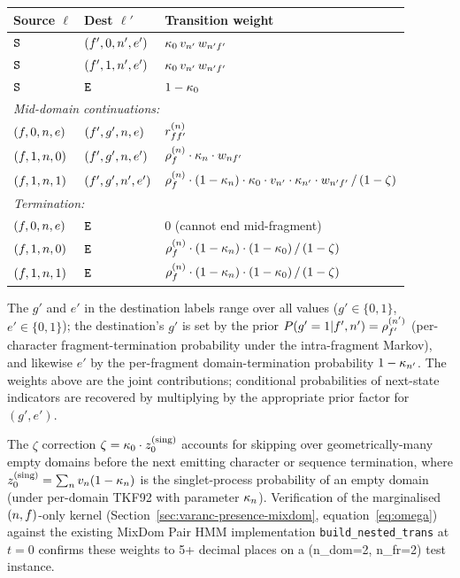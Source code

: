 \begin{center}
\renewcommand{\arraystretch}{1.4}
\begin{tabular}{lll}
\hline
Source $\ell$ & Dest $\ell'$ & Transition weight \\
\hline
${\tt S}$ & $(f', 0, n', e')$ &
  $\kappa_0\, v_{n'}\, w_{n'f'}$ \\
${\tt S}$ & $(f', 1, n', e')$ &
  $\kappa_0\, v_{n'}\, w_{n'f'}$ \\
${\tt S}$ & ${\tt E}$ & $1 - \kappa_0$ \\
\hline
\multicolumn{3}{l}{\emph{Mid-domain continuations:}} \\
$(f, 0, n, e)$ & $(f', g', n, e)$ &
  $r^{(n)}_{ff'}$ \\
$(f, 1, n, 0)$ & $(f', g', n, e')$ &
  $\rho^{(n)}_f \cdot \kappa_n \cdot w_{nf'}$ \\
$(f, 1, n, 1)$ & $(f', g', n', e')$ &
  $\rho^{(n)}_f \cdot (1-\kappa_n) \cdot \kappa_0 \cdot v_{n'} \cdot \kappa_{n'} \cdot w_{n'f'}\,/\,(1-\zeta)$ \\
\hline
\multicolumn{3}{l}{\emph{Termination:}} \\
$(f, 0, n, e)$ & ${\tt E}$ & $0$ \quad (cannot end mid-fragment) \\
$(f, 1, n, 0)$ & ${\tt E}$ &
  $\rho^{(n)}_f \cdot (1-\kappa_n) \cdot (1-\kappa_0)\,/\,(1-\zeta)$ \\
$(f, 1, n, 1)$ & ${\tt E}$ &
  $\rho^{(n)}_f \cdot (1-\kappa_n) \cdot (1-\kappa_0)\,/\,(1-\zeta)$ \\
\hline
\end{tabular}
\end{center}
The $g'$ and $e'$ in the destination labels range over all values
($g' \in \{0,1\}$, $e' \in \{0,1\}$); the destination's $g'$ is set by
the prior $P(g' = 1 | f', n') = \rho^{(n')}_{f'}$
(per-character fragment-termination probability under the
intra-fragment Markov), and likewise $e'$ by the per-fragment
domain-termination probability $1-\kappa_{n'}$. The weights above
are the joint contributions; conditional probabilities of next-state
indicators are recovered by multiplying by the appropriate prior
factor for $(g', e')$.

The $\zeta$ correction $\zeta = \kappa_0 \cdot
z_0^{(\rm sing)}$ accounts for skipping over geometrically-many
empty domains before the next emitting character or sequence
termination, where $z_0^{(\rm sing)} = \sum_n v_n
(1-\kappa_n)$ is the singlet-process probability of an empty
domain (under per-domain TKF92 with parameter $\kappa_n$).
Verification of the marginalised $(n, f)$-only kernel
(Section~\ref{sec:varanc-presence-mixdom}, equation~\eqref{eq:omega})
against the existing MixDom Pair HMM implementation
\texttt{build\_nested\_trans} at $t=0$ confirms these weights to 5+
decimal places on a (n\_dom=2, n\_fr=2) test instance.

